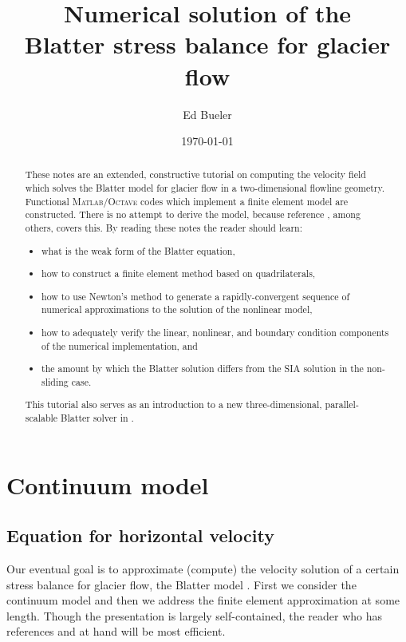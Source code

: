 \documentclass[11pt,final,reqno]{amsart}
\theoremstyle{remark}
\theoremstyle{definition}
\newcommand{\Matlab}{\textsc{Matlab}\xspace}
\newcommand{\Octave}{\textsc{Octave}\xspace}
\begin{document}
\title[Numerical solution of the Blatter stress balance]{Numerical solution of the \\ Blatter stress balance for glacier flow}
\author{Ed Bueler}
\date{\today}

\begin{abstract}
These notes are an extended, constructive tutorial on computing the velocity field which solves the Blatter model for glacier flow \cite{Blatter,ColingeRappaz,Pattyn03} in a two-dimensional flowline geometry.  Functional \Matlab/\Octave codes which implement a finite element model \cite{Elmanetal2005} are constructed.  There is no attempt to derive the model, because reference \cite{SchoofHindmarsh}, among others, covers this.  By reading these notes the reader should learn:
\begin{itemize}
\item what is the weak form of the Blatter equation,
\item how to construct a finite element method based on quadrilaterals,
\item how to use Newton's method to generate a rapidly-convergent sequence of numerical approximations to the solution of the nonlinear model,
\item how to adequately verify the linear, nonlinear, and boundary condition components of the numerical implementation, and
\item the amount by which the Blatter solution differs from the SIA solution in the non-sliding case.
\end{itemize}
This tutorial also serves as an introduction to a new three-dimensional, parallel-scalable Blatter solver in \cite{BrownSmithAhmadia}.
\end{abstract}

\maketitle

\setcounter{tocdepth}{1}
\tableofcontents
\vfill


\newpage
\section{Continuum model}\label{sec:continuum}

\subsection*{Equation for horizontal velocity}  Our eventual goal is to approximate (compute) the velocity solution of a certain stress balance for glacier flow, the Blatter model \cite{Blatter,ColingeRappaz,Pattyn03,SchoofCoulombBlatter,SchoofHindmarsh}.  First we consider the continuum model and then we address the finite element approximation at some length.  Though the presentation is largely self-contained, the reader who has references \cite{Elmanetal2005} and \cite{SchoofHindmarsh} at hand will be most efficient.
\end{document}
